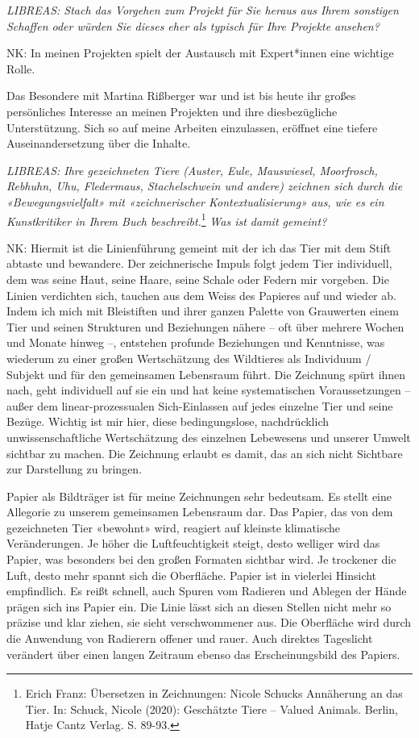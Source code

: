 \documentclass[a4paper,
fontsize=11pt,
oneside,
numbers=noperiodatend,
parskip=half-,
bibliography=totoc,
final
]{scrartcl}
\begin{document}
\emph{LIBREAS: Stach das Vorgehen zum Projekt für Sie heraus aus Ihrem
sonstigen Schaffen oder würden Sie dieses eher als typisch für Ihre
Projekte ansehen?}

NK: In meinen Projekten spielt der Austausch mit Expert*innen eine
wichtige Rolle.

Das Besondere mit Martina Rißberger war und ist bis heute ihr großes
persönliches Interesse an meinen Projekten und ihre diesbezügliche
Unterstützung. Sich so auf meine Arbeiten einzulassen, eröffnet eine
tiefere Auseinandersetzung über die Inhalte.

\emph{LIBREAS: Ihre gezeichneten Tiere (Auster, Eule, Mauswiesel,
Moorfrosch, Rebhuhn, Uhu, Fledermaus, Stachelschwein und andere)
zeichnen sich durch die «Bewegungsvielfalt» mit «zeichnerischer
Kontextualisierung» aus, wie es ein Kunstkritiker in Ihrem Buch
beschreibt.}\footnote{Erich Franz: Übersetzen in Zeichnungen: Nicole
  Schucks Annäherung an das Tier. In: Schuck, Nicole (2020): Geschätzte
  Tiere -- Valued Animals. Berlin, Hatje Cantz Verlag. S. 89-93.}
\emph{Was ist damit gemeint?}

NK: Hiermit ist die Linienführung gemeint mit der ich das Tier mit dem
Stift abtaste und bewandere. Der zeichnerische Impuls folgt jedem Tier
individuell, dem was seine Haut, seine Haare, seine Schale oder Federn
mir vorgeben. Die Linien verdichten sich, tauchen aus dem Weiss des
Papieres auf und wieder ab. Indem ich mich mit Bleistiften und ihrer
ganzen Palette von Grauwerten einem Tier und seinen Strukturen und
Beziehungen nähere -- oft über mehrere Wochen und Monate hinweg --,
entstehen profunde Beziehungen und Kenntnisse, was wiederum zu einer
großen Wertschätzung des Wildtieres als Individuum / Subjekt und für den
gemeinsamen Lebensraum führt. Die Zeichnung spürt ihnen nach, geht
individuell auf sie ein und hat keine systematischen Voraussetzungen --
außer dem linear-prozessualen Sich-Einlassen auf jedes einzelne Tier und
seine Bezüge. Wichtig ist mir hier, diese bedingungslose, nachdrücklich
unwissenschaftliche Wertschätzung des einzelnen Lebewesens und unserer
Umwelt sichtbar zu machen. Die Zeichnung erlaubt es damit, das an sich
nicht Sichtbare zur Darstellung zu bringen.

Papier als Bildträger ist für meine Zeichnungen sehr bedeutsam. Es
stellt eine Allegorie zu unserem gemeinsamen Lebensraum dar. Das Papier,
das von dem gezeichneten Tier «bewohnt» wird, reagiert auf kleinste
klimatische Veränderungen. Je höher die Luftfeuchtigkeit steigt, desto
welliger wird das Papier, was besonders bei den großen Formaten sichtbar
wird. Je trockener die Luft, desto mehr spannt sich die Oberfläche.
Papier ist in vielerlei Hinsicht empfindlich. Es reißt schnell, auch
Spuren vom Radieren und Ablegen der Hände prägen sich ins Papier ein.
Die Linie lässt sich an diesen Stellen nicht mehr so präzise und klar
ziehen, sie sieht verschwommener aus. Die Oberfläche wird durch die
Anwendung von Radierern offener und rauer. Auch direktes Tageslicht
verändert über einen langen Zeitraum ebenso das Erscheinungsbild des
Papiers.
\end{document}
